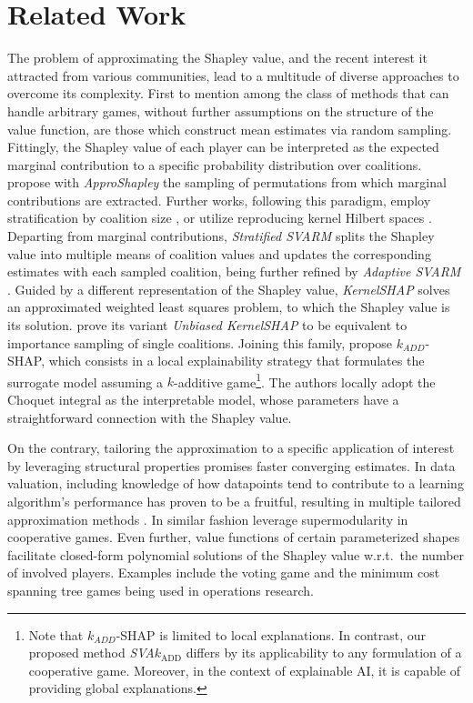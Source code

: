 \section{Related Work}
\label{sec:related_work}

The problem of approximating the Shapley value, and the recent interest it attracted from various communities, lead to a multitude of diverse approaches to overcome its complexity.
First to mention among the class of methods that can handle arbitrary games, without further assumptions on the structure of the value function, are those which construct mean estimates via random sampling.
Fittingly, the Shapley value of each player can be interpreted as the expected marginal contribution to a specific probability distribution over coalitions.
\citet{Castro.2009} propose with \emph{ApproShapley} the sampling of permutations from which marginal contributions are extracted.
Further works, following this paradigm, employ stratification by coalition size \citep{Maleki.2013,Castro.2017,vanCampen.2018, Okhrati.2020}, or utilize reproducing kernel Hilbert spaces \citep{Mitchell.2022}.
Departing from marginal contributions, \emph{Stratified SVARM} \citep{Kolpaczki.2024a} splits the Shapley value into multiple means of coalition values and updates the corresponding estimates with each sampled coalition, being further refined by \emph{Adaptive SVARM} \citep{Kolpaczki.2024b}.
Guided by a different representation of the Shapley value, \emph{KernelSHAP} \citep{Lundberg.2017} solves an approximated weighted least squares problem, to which the Shapley value is its solution.
\citet{Fumagalli.2023} prove its variant \emph{Unbiased KernelSHAP} \cite{Covert.2021} to be equivalent to importance sampling of single coalitions.
Joining this family, \cite{Pelegrina.2023} propose $k_{ADD}$-SHAP, which consists in a local explainability strategy that formulates the surrogate model assuming a $k$-additive game\footnote{
    Note that $k_{ADD}$-SHAP is limited to local explanations.
    In contrast, our proposed method \emph{SVA}$k_{\text{ADD}}$ differs by its applicability to any formulation of a cooperative game.
    Moreover, in the context of explainable AI, it is capable of providing global explanations.
}.
The authors locally adopt the Choquet integral as the interpretable model, whose parameters have a straightforward connection with the Shapley value.

On the contrary, tailoring the approximation to a specific application of interest by leveraging structural properties promises faster converging estimates.
In data valuation, including knowledge of how datapoints tend to contribute to a learning algorithm's performance has proven to be a fruitful, resulting in multiple tailored approximation methods \cite{Ghorbani.2019, Jia.2019a, Jia.2019b}.
In similar fashion \citet{Liben-Nowell.2012} leverage supermodularity in cooperative games.
Even further, value functions of certain parameterized shapes facilitate closed-form polynomial solutions of the Shapley value w.r.t.\ the number of involved players.
Examples include the voting game \citep{Bilbao.2000} and the minimum cost spanning tree games \citep{Granot.2002} being used in operations research.

